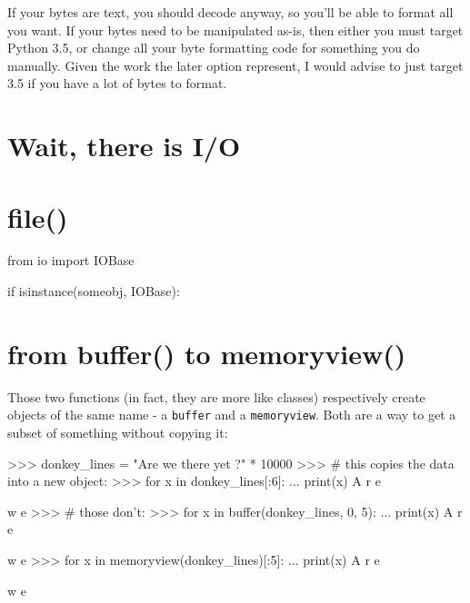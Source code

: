 \begin{py2}
\begin{py2}
\begin{py2}
\begin{py2}
If your bytes are text, you should decode anyway, so you'll be able to format all you want. If your bytes need to be manipulated as-is, then either you must target Python 3.5, or change all your byte formatting code for something you do manually. Given the work the later option represent, I would advise to just target 3.5 if you have a lot of bytes to format.

\section{Wait, there is I/O}






\section{file()}

\begin{py2}
from io import IOBase

if isinstance(someobj, IOBase):
\end{py2}

\section{from buffer() to memoryview()}

Those two functions (in fact, they are more like classes) respectively create objects of the same name - a \lstinline{buffer} and a \lstinline{memoryview}. Both are a way to get a subset of something without copying it:

\begin{py2}
>>> donkey_lines = "Are we there yet ?\n" * 10000
>>> # this copies the data into a new object:
>>> for x in donkey_lines[:6]:
...    print(x)
A
r
e

w
e
>>> # those don't:
>>> for x in buffer(donkey_lines, 0, 5):
...    print(x)
A
r
e

w
e
>>> for x in memoryview(donkey_lines)[:5]:
...    print(x)
A
r
e

w
e
\end{py2}


\end{py2}
\end{py2}
\end{py2}
\end{py2}
